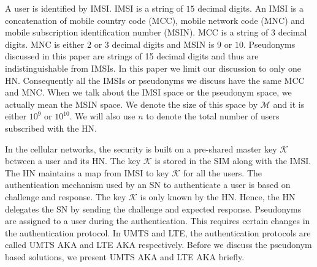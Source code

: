 \documentclass{llncs} %
\begin{document}
A user is identified by IMSI. IMSI is a string of $15$ decimal digits. An IMSI is a concatenation of mobile country code (MCC), mobile network code (MNC) and mobile subscription identification number (MSIN). MCC is a string of $3$ decimal digits. MNC is either $2$ or $3$ decimal digits and MSIN is $9$ or $10$. Pseudonyms discussed in this paper are strings of 15 decimal digits and thus are indistinguishable from IMSIs. In this paper we limit our discussion to only one HN. Consequently all the IMSIs or pseudonyms we discuss have the same MCC and MNC. When we talk about the IMSI space or the pseudonym space, we actually mean the MSIN space. We denote the size of this space by $\mathcal{M}$ and it is either $10^9$ or $10^{10}$. We will also use $n$ to denote the total number of users subscribed with the HN.

In the cellular networks, the security is built on a pre-shared master key $\mathcal{K}$ between a user and its HN. The key $\mathcal{K}$ is stored in the SIM along with the IMSI. The HN maintains a map from IMSI to key $\mathcal{K}$ for all the users. The authentication mechanism used by an SN to authenticate a user is based on challenge and response. The key $\mathcal{K}$ is only known by the HN. Hence, the HN delegates the SN by sending the challenge and expected response. %
Pseudonyms are assigned to a user during the authentication. This requires certain changes in the authentication protocol. In UMTS and LTE, the authentication protocols are called UMTS AKA and LTE AKA respectively. Before we discuss the pseudonym based solutions, we present UMTS AKA  and LTE AKA briefly.


\end{document}
